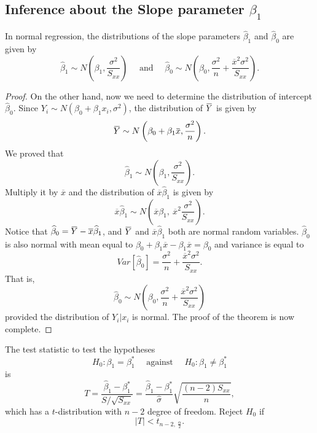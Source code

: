 \subsection{Inference about the Slope parameter $\beta_1$}

\begin{lemma}
    In normal regression, the distributions of the slope parameters 
    $\widehat{\beta}_1$ and $\widehat{\beta}_0$ are given by
    \begin{equation}
        \widehat{\beta}_1 \sim N \left(\beta_1, \frac{\sigma^2}{S_{xx}}\right) \quad \text{ and } \quad 
        \widehat{\beta}_0 \sim N \left(\beta_0, \frac{\sigma^2}{n} + \frac{\overline{x}^2 \sigma^2}{S_{xx}}\right).
    \end{equation}
\end{lemma}
\begin{proof}
    On the other hand, now we need to determine the distribution of intercept 
    $\widehat{\beta}_0$. Since $Y_i \sim N(\beta_0 + \beta_1 x_i, \sigma^2)$, the distribution of 
    $\ols{Y}$ is given by 
    \[
        \ols{Y} \sim N \left(\beta_0 + \beta_1 \ols{x}, \frac{\sigma^2}{n} \right).
    \]
    We proved that 
    \[
        \widehat{\beta}_1 \sim N\left(\beta_1, \frac{\sigma^2}{S_{xx}} \right).
    \]
    Multiply it by $\overline{x}$ and the distribution of $\overline{x}\widehat{\beta}_1$ is given by 
    \[
        \overline{x}\widehat{\beta}_1 \sim N\left(\overline{x}\beta_1,\> \overline{x}^2 \frac{\sigma^2}{S_{xx}} \right).
    \]
    Notice that $\widehat{\beta}_0 = \ols{Y} - \overline{x}\widehat{\beta}_1$, and $\ols{Y}$ and 
    $\overline{x}\widehat{\beta}_1$ both are normal random variables. $\widehat{\beta}_0$ is also 
    normal with mean equal to $\beta_0 + \beta_1 \overline{x} - \beta_1 \overline{x} = \beta_0$ and variance 
    is equal to 
    \[
        Var[\widehat{\beta}_0] = \frac{\sigma^2}{n} + \frac{\overline{x}^2 \sigma^2}{S_{xx}}.
    \]
    That is, 
    \[
        \widehat{\beta}_0 \sim N \left(\beta_0, \frac{\sigma^2}{n} + \frac{\overline{x}^2 \sigma^2}{S_{xx}}\right)
    \]
    provided the distribution of $Y_i | x_i$ is normal. The proof of the theorem is now complete.
\end{proof}

\begin{theorem}
    The test statistic to test the hypotheses
    \[
        H_0: \beta_1 = \beta_1^* \quad \text{ against } \quad H_0: \beta_1 \neq \beta_1^*
    \]
    is 
    \begin{equation}
        T = \frac{\widehat{\beta}_1 - \beta_1^*}{S/ \sqrt{S_{xx}}} = 
        \frac{\widehat{\beta}_1 - \beta_1^*}{\widehat{\sigma}} \sqrt{\frac{(n-2) S_{xx}}{n}},
    \end{equation}
    which has a $t$-distribution with $n-2$ degree of freedom. Reject $H_0$ if 
    \[
        |T| < t_{n-2, \> \frac{\alpha}{2}}.
    \]
\end{theorem}

